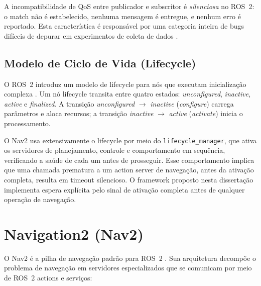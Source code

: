A incompatibilidade de QoS entre publicador e subscritor é \textit{silenciosa}
no ROS~2: o match não é estabelecido, nenhuma mensagem é entregue, e nenhum
erro é reportado. Esta característica é responsável por uma categoria inteira
de bugs difíceis de depurar em experimentos de coleta de dados \cite{macenski2022ros2}.

\subsection{Modelo de Ciclo de Vida (Lifecycle)}
\label{sec:lifecycle}

O ROS~2 introduz um modelo de lifecycle para nós que executam inicialização
complexa \cite{macenski2022ros2}. Um nó lifecycle transita entre quatro estados:
\textit{unconfigured}, \textit{inactive}, \textit{active} e \textit{finalized}.
A transição \textit{unconfigured} $\to$ \textit{inactive} (\textit{configure})
carrega parâmetros e aloca recursos; a transição \textit{inactive} $\to$
\textit{active} (\textit{activate}) inicia o processamento.

O Nav2 usa extensivamente o lifecycle por meio do \texttt{lifecycle\_\allowbreak manager},
que ativa os servidores de planejamento, controle e comportamento em sequência,
verificando a saúde de cada um antes de prosseguir. Esse comportamento implica
que uma chamada prematura a um action server de navegação, antes da ativação
completa, resulta em timeout silencioso. O framework proposto nesta dissertação
implementa espera explícita pelo sinal de ativação completa antes de qualquer
operação de navegação.

\section{Navigation2 (Nav2)}
\label{sec:nav2}

O Nav2 é a pilha de navegação padrão para ROS~2 \cite{macenski2020marathon}.
Sua arquitetura decompõe o problema de navegação em servidores especializados
que se comunicam por meio de ROS~2 actions e serviços:

